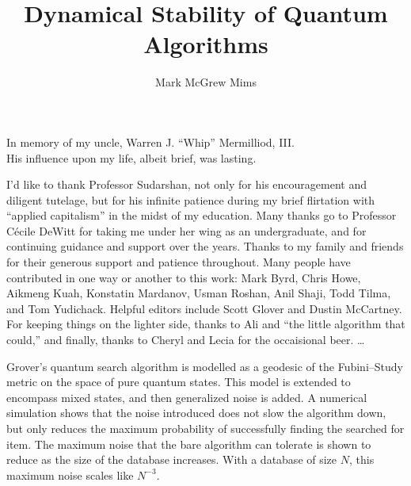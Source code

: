 \documentclass[12pt]{report} %
\author{Mark McGrew Mims}  %
\title{Dynamical Stability of Quantum Algorithms}
\theoremstyle{definition}
\theoremstyle{remark}
\begin{document}
\copyrightpage                  %

\titlepage                      %

\signaturepage                  %


\begin{dedication}              %
%
In memory of my uncle, Warren J. ``Whip'' Mermilliod, III.  \\
His influence upon my life, albeit brief, was lasting.
\end{dedication}


\begin{acknowledgments}

I'd like to thank Professor Sudarshan, not only 
for his encouragement and diligent tutelage, but for his 
infinite patience during my brief flirtation with 
``applied capitalism'' in the midst of my education.
%
Many thanks go to Professor C\'ecile DeWitt for taking
me under her wing as an undergraduate, and for 
continuing guidance and support over the years.
%
Thanks to my family and friends for
their generous support and patience throughout.
%
Many people have contributed in one way or another
to this work:
Mark Byrd,
Chris Howe,
Aikmeng Kuah,
Konstatin Mardanov,
Usman Roshan,
Anil Shaji,
Todd Tilma,
and Tom Yudichack.
Helpful editors include Scott Glover and Dustin McCartney.
For keeping things on the lighter side, thanks to Ali
and ``the little algorithm that could,''  and finally,
thanks to Cheryl and Lecia for the occaisional beer.
\dots
\end{acknowledgments}

\utabstract       %

Grover's quantum search algorithm is modelled as a geodesic
of the Fubini--Study metric on the %
space of pure quantum states.  This model is extended to
encompass mixed states, and then generalized noise is added.
A numerical simulation shows that 
the noise introduced does not slow the algorithm down, but only
reduces the maximum probability of successfully finding the 
searched for item.  The maximum noise that the bare algorithm
can tolerate is shown to reduce as the size of the database
increases.  With a database of size $N$, this maximum noise 
scales like $N^{-3}$.
\end{document}

